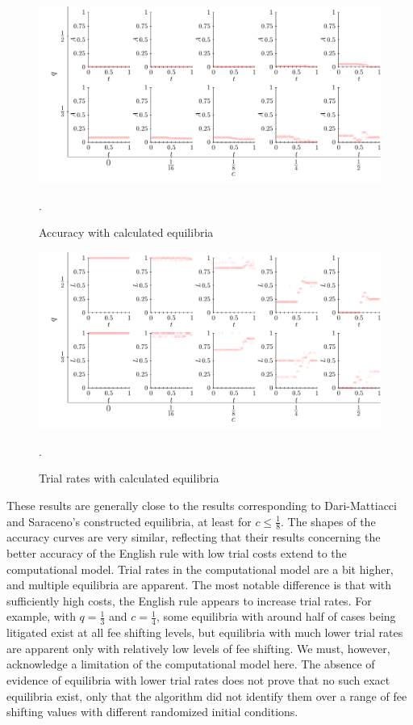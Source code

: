 \documentclass{article}
\begin{document}
\begin{figure}[h!]
\centering
\includegraphics[scale=0.60, trim={0.05in 0.15in 0in 0in}, clip]{../Figures/Original accuracy.pdf}
\vspace*{-2mm}
\caption{Accuracy with calculated equilibria}. 
\label{fig:origaccuracy}
\end{figure}

\begin{figure}[h!]
\centering
\includegraphics[scale=0.60, trim={0.05in 0.15in 0in 0in}, clip]{../Figures/Original trial.pdf}
\vspace*{-2mm}
\caption{Trial rates with calculated equilibria}. 
\label{fig:origtrial}
\end{figure}

These results are generally close to the results corresponding to Dari-Mattiacci and Saraceno's constructed equilibria, at least for $c \leq \frac{1}{8}$. The shapes of the accuracy curves are very similar, reflecting that their results concerning the better accuracy of the English rule with low trial costs extend to the computational model. Trial rates in the computational model are a bit higher, and multiple equilibria are apparent. The most notable difference is that with sufficiently high costs, the English rule appears to increase trial rates. For example, with $q = \frac{1}{3}$ and $c = \frac{1}{4}$, some equilibria with around half of cases being litigated exist at all fee shifting levels, but equilibria with much lower trial rates are apparent only with relatively low levels of fee shifting. We must, however, acknowledge a limitation of the computational model here. The absence of evidence of equilibria with lower trial rates does not prove that no such exact equilibria exist, only that the algorithm did not identify them over a range of fee shifting values with different randomized initial conditions.
\end{document}

